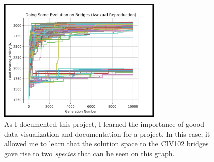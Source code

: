 \documentclass[a4paper,12pt]{article}
\begin{document}
\begin{figure}[H]
\centering
\includegraphics[width=0.7\textwidth]{img/image006.png}
\caption{As I documented this project, I learned the importance of goood data visualization and documentation for a project. In this case, it allowed me to learn that the solution space to the CIV102 bridges gave rise to two \textit{species} that can be seen on this graph.}
\label{}
\end{figure}
\end{document}
